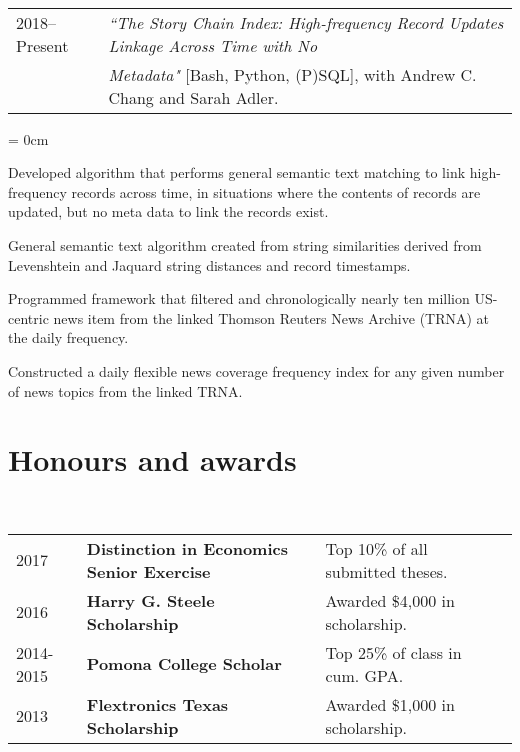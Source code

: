\documentclass[a4paper, 11pt]{article}
\begin{document}
    \vspace*{1em}

    ~\begin{tabular}{lP{15cm}}
      2018--Present & \textit{``The Story Chain Index: High-frequency Record Updates Linkage Across Time with No}\\
      & \textit{Metadata"} {[Bash, Python, (P)SQL]}, with Andrew C. Chang and Sarah Adler.
    \end{tabular}

    \begin{compactitem}\parskip = 0cm
      \item Developed algorithm that performs general semantic text matching to link high-frequency records across time, in situations where the contents of records are updated, but no meta data to link the records exist.
      \item General semantic text algorithm created from string similarities derived from Levenshtein and Jaquard string distances and record timestamps.
      \item Programmed framework that filtered and chronologically nearly ten million US-centric news item from the linked Thomson Reuters News Archive (TRNA) at the daily frequency.
      \item Constructed a daily flexible news coverage frequency index for any given number of news topics from the linked TRNA.
    \end{compactitem}

  \section{Honours and awards}
    ~\begin{tabular}{lllP{1cm}}
      2017 & \textbf{Distinction in Economics Senior Exercise} & Top 10\% of all submitted theses.\\
      2016 & \textbf{Harry G. Steele Scholarship} & Awarded \$4,000 in scholarship.\\
      2014-2015 & \textbf{Pomona College Scholar} & Top 25\% of class in cum. GPA.\\
      2013 & \textbf{Flextronics Texas Scholarship} & Awarded \$1,000 in scholarship.
    \end{tabular}
\end{document}

